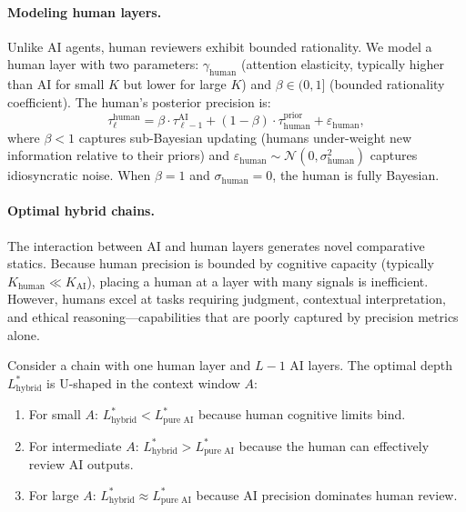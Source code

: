 \paragraph{Modeling human layers.} Unlike AI agents, human reviewers exhibit bounded rationality. We model a human layer with two parameters: $\gamma_{\text{human}}$ (attention elasticity, typically higher than AI for small $K$ but lower for large $K$) and $\beta \in (0,1]$ (bounded rationality coefficient). The human's posterior precision is:
\begin{equation}\label{eq:human_update}
\tau^{\text{human}}_\ell = \beta \cdot \tau^{\text{AI}}_{\ell-1} + (1-\beta) \cdot \tau^{\text{prior}}_{\text{human}} + \varepsilon_{\text{human}},
\end{equation}
where $\beta < 1$ captures sub-Bayesian updating (humans under-weight new information relative to their priors) and $\varepsilon_{\text{human}} \sim \mathcal{N}(0, \sigma^2_{\text{human}})$ captures idiosyncratic noise. When $\beta = 1$ and $\sigma_{\text{human}} = 0$, the human is fully Bayesian.

\paragraph{Optimal hybrid chains.} The interaction between AI and human layers generates novel comparative statics. Because human precision is bounded by cognitive capacity (typically $K_{\text{human}} \ll K_{\text{AI}}$), placing a human at a layer with many signals is inefficient. However, humans excel at tasks requiring judgment, contextual interpretation, and ethical reasoning---capabilities that are poorly captured by precision metrics alone.

\begin{proposition}\label{prop:hybrid_depth}
Consider a chain with one human layer and $L-1$ AI layers. The optimal depth $L^*_{\text{hybrid}}$ is U-shaped in the context window $A$: 
\begin{enumerate}[label=(\roman*)]
\item For small $A$: $L^*_{\text{hybrid}} < L^*_{\text{pure AI}}$ because human cognitive limits bind.
\item For intermediate $A$: $L^*_{\text{hybrid}} > L^*_{\text{pure AI}}$ because the human can effectively review AI outputs.
\item For large $A$: $L^*_{\text{hybrid}} \approx L^*_{\text{pure AI}}$ because AI precision dominates human review.
\end{enumerate}
\end{proposition}

